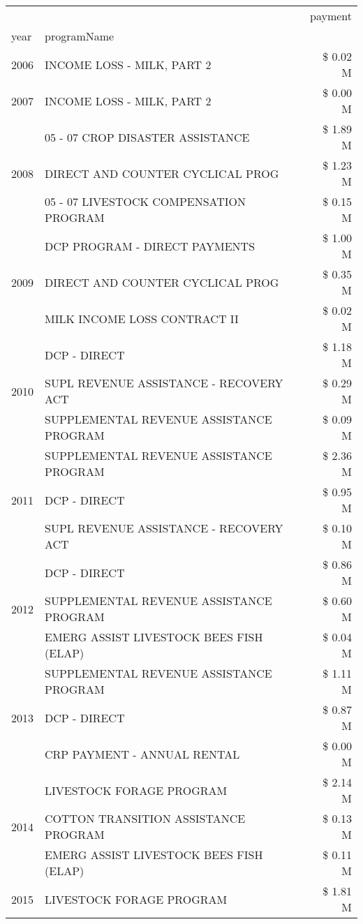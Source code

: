 \begin{tabular}{llr}
\toprule
 &  & payment \\
year & programName &  \\
\midrule
2006 & INCOME LOSS - MILK, PART 2 & \$ 0.02 M \\
\cline{1-3}
2007 & INCOME LOSS - MILK, PART 2 & \$ 0.00 M \\
\cline{1-3}
\multirow[t]{3}{*}{2008} & 05 - 07 CROP DISASTER ASSISTANCE & \$ 1.89 M \\
 & DIRECT AND COUNTER CYCLICAL PROG & \$ 1.23 M \\
 & 05 - 07 LIVESTOCK COMPENSATION PROGRAM & \$ 0.15 M \\
\cline{1-3}
\multirow[t]{3}{*}{2009} & DCP PROGRAM - DIRECT PAYMENTS & \$ 1.00 M \\
 & DIRECT AND COUNTER CYCLICAL PROG & \$ 0.35 M \\
 & MILK INCOME LOSS CONTRACT II & \$ 0.02 M \\
\cline{1-3}
\multirow[t]{3}{*}{2010} & DCP - DIRECT & \$ 1.18 M \\
 & SUPL REVENUE ASSISTANCE - RECOVERY ACT & \$ 0.29 M \\
 & SUPPLEMENTAL REVENUE ASSISTANCE PROGRAM & \$ 0.09 M \\
\cline{1-3}
\multirow[t]{3}{*}{2011} & SUPPLEMENTAL REVENUE ASSISTANCE PROGRAM & \$ 2.36 M \\
 & DCP - DIRECT & \$ 0.95 M \\
 & SUPL REVENUE ASSISTANCE - RECOVERY ACT & \$ 0.10 M \\
\cline{1-3}
\multirow[t]{3}{*}{2012} & DCP - DIRECT & \$ 0.86 M \\
 & SUPPLEMENTAL REVENUE ASSISTANCE PROGRAM & \$ 0.60 M \\
 & EMERG ASSIST LIVESTOCK BEES FISH (ELAP) & \$ 0.04 M \\
\cline{1-3}
\multirow[t]{3}{*}{2013} & SUPPLEMENTAL REVENUE ASSISTANCE PROGRAM & \$ 1.11 M \\
 & DCP - DIRECT & \$ 0.87 M \\
 & CRP PAYMENT - ANNUAL RENTAL & \$ 0.00 M \\
\cline{1-3}
\multirow[t]{3}{*}{2014} & LIVESTOCK FORAGE PROGRAM & \$ 2.14 M \\
 & COTTON TRANSITION ASSISTANCE PROGRAM & \$ 0.13 M \\
 & EMERG ASSIST LIVESTOCK BEES FISH (ELAP) & \$ 0.11 M \\
\cline{1-3}
\multirow[t]{3}{*}{2015} & LIVESTOCK FORAGE PROGRAM & \$ 1.81 M \\

\end{tabular}
